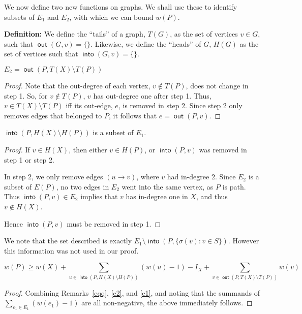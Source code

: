 \documentclass{article}
\DeclareMathOperator{\out}{\bm{\mathsf{out}}}
\DeclareMathOperator{\into}{\bm{\mathsf{into}}}
\newcommand{\dc}[1]{}%
\begin{document}
\vspace{1.75em}

We now define two new functions on graphs. We shall use these to identify subsets of $E_1$ and $E_2$, with which we can bound $w(P)$. 

\textbf{Definition:}\dc{amsthm} We define the ``tails'' of a graph, $T(G)$, as the set of vertices $v \in G$, such that $\out(G,v) = \{\}$. Likewise, we define the ``heads'' of $G$, $H(G)$ as the set of vertices such that $\into(G,v) = \{\}$.

\begin{rmk}\label{e2} $E_2 = \out(P,T(X)\setminus T(P))$
\begin{proof}
Note that the out-degree of each vertex, $v\not\in T(P)$, does not change in step 1. So, for $v \not \in T(P)$, $v$ has out-degree one after step 1. Thus, $v \in T(X)\setminus T(P)$ iff its out-edge, $e$, is removed in step 2. Since step 2 only removes edges that belonged to $P$, it follows that $e = \out(P,v)$.
\end{proof}


\end{rmk}

\begin{rmk}\label{e1} $\into(P,H(X)\setminus H(P))$ is a subset of $E_1$.
\begin{proof}
If $v \in H(X)$, then either $v \in H(P)$, or $\into(P,v)$ was removed in step 1 or step 2.

In step 2, we only remove edges $(u\to v)$, where $v$ had in-degree 2. Since $E_2$ is a subset of $E(P)$, no two edges in $E_2$ went into the same vertex, as $P$ is path. Thus $\into(P,v) \in E_2$ implies that $v$ has in-degree one in $X$, and thus $v \not \in H(X)$.

Hence $\into(P,v)$ must be removed in step 1.
\end{proof}
\end{rmk}
\noindent We note that the set described is exactly $E_1 \setminus \into(P,\{ \sigma(v): v \in S\})$. However this information was not used in our proof.

\vspace{1.75em}


\begin{lem} \label{weight rule} 

\[w(P) \geq w(X) + \sum_{u \in \into(P,H(X)\setminus H(P))} (w(u)-1) -I_X + \sum_{v \in \out(P,T(X)\setminus T(P))} w(v)\] 
\begin{proof}
Combining Remarks~\ref{eqq}, \ref{e2}, and \ref{e1}, and noting that the summands of \linebreak $\sum_{e_1\in E_1} (w(e_1)-1)$ are all non-negative, the above immediately follows.
\end{proof}

\end{lem}
\end{document}
